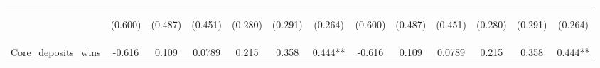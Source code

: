 \documentclass[]{article}
\begin{document}
\begin{center}
\begin{tabular}{lcccccccccccc}
\vspace{4pt} & \begin{footnotesize}(0.600)\end{footnotesize} & \begin{footnotesize}(0.487)\end{footnotesize} & \begin{footnotesize}(0.451)\end{footnotesize} & \begin{footnotesize}(0.280)\end{footnotesize} & \begin{footnotesize}(0.291)\end{footnotesize} & \begin{footnotesize}(0.264)\end{footnotesize} & \begin{footnotesize}(0.600)\end{footnotesize} & \begin{footnotesize}(0.487)\end{footnotesize} & \begin{footnotesize}(0.451)\end{footnotesize} & \begin{footnotesize}(0.280)\end{footnotesize} & \begin{footnotesize}(0.291)\end{footnotesize} & \begin{footnotesize}(0.264)\end{footnotesize} \\
Core\_deposits\_wins & -0.616 & 0.109 & 0.0789 & 0.215 & 0.358 & 0.444** & -0.616 & 0.109 & 0.0789 & 0.215 & 0.358 & 0.444** \\

\end{tabular}
\end{center}
\end{document}
